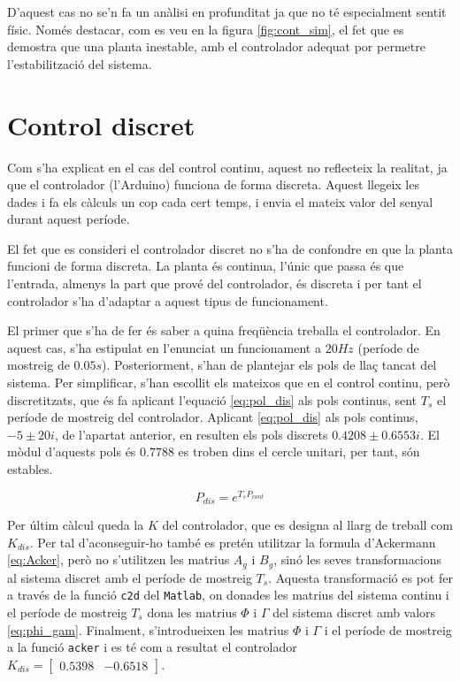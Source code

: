 \documentclass[12pt,a4paper,final,twoside,openright]{report}
\begin{document}
D'aquest cas no se'n fa un anàlisi en profunditat ja que no té especialment sentit físic. Només destacar, com es veu en la figura \ref{fig:cont_sim}, el fet que es demostra que una planta inestable, amb el controlador adequat por permetre l'estabilització del sistema.


\section{Control discret}

Com s'ha explicat en el cas del control continu, aquest no reflecteix la realitat, ja que el controlador (l'Arduino) funciona de forma discreta. Aquest llegeix les dades i fa els càlculs un cop cada cert temps, i envia el mateix valor del senyal durant aquest període.

El fet que es consideri el controlador discret no s'ha de confondre en que la planta funcioni de forma discreta. La planta és continua, l'únic que passa és que l'entrada, almenys la part que prové del controlador, és discreta i per tant el controlador s'ha d'adaptar a aquest tipus de funcionament. 

El primer que s'ha de fer és saber a quina freqüència treballa el controlador. En aquest cas, s'ha estipulat en l'enunciat un funcionament a $20 Hz$ (període de mostreig de $0.05 s$). Posteriorment, s'han de plantejar els pols de llaç tancat del sistema. Per simplificar, s'han escollit els mateixos que en el control continu, però discretitzats, que és fa aplicant l'equació \eqref{eq:pol_dis} als pols continus, sent $T_s$ el període de mostreig del controlador. Aplicant \eqref{eq:pol_dis} als pols continus, $-5\pm20i$, de l'apartat anterior, en resulten els pols discrets $0.4208\pm0.6553i$. El mòdul d'aquests pols és $0.7788$ es troben dins el cercle unitari, per tant, són estables. 

\begin{equation}\label{eq:pol_dis}
P_{dis} = e^{T_s P_{cont}}
\end{equation}
\vspace{10pt}


Per últim càlcul queda la $K$ del controlador, que es designa al llarg de treball com $K_{dis}$. Per tal d'aconseguir-ho també es pretén utilitzar la formula d'Ackermann \eqref{eq:Acker}, però no s'utilitzen les matrius $A_g$ i $B_g$, sinó les seves transformacions al sistema discret amb el període de mostreig $T_s$. Aquesta transformació es pot fer a través de la funció \texttt{c2d} del \texttt{Matlab}, on donades les matrius del sistema continu i el període de mostreig $T_s$ dona les matrius $\Phi$ i $\Gamma$ del sistema discret amb valors \eqref{eq:phi_gam}. Finalment, s'introdueixen les matrius $\Phi$ i $\Gamma$ i el període de mostreig a la funció \texttt{acker} i es té com a resultat el controlador $K_{dis} = \begin{bmatrix}
0.5398 & -0.6518
\end{bmatrix}$.\label{pag:trans_phi_gam}
\end{document}
